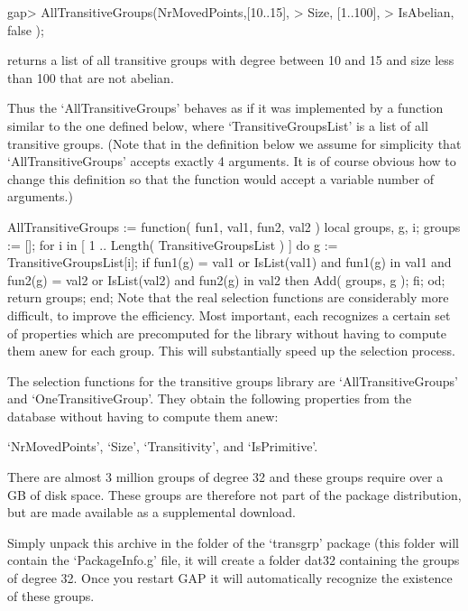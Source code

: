 \beginexample
gap> AllTransitiveGroups(NrMovedPoints,[10..15],
>                        Size,         [1..100],
>                        IsAbelian,    false    );
\endexample

returns a list of all transitive groups with degree between 10 and 15 and
size less than 100 that are not abelian.

Thus  the `AllTransitiveGroups'  behaves  as if   it was implemented  by a
function similar to the one defined below, where `TransitiveGroupsList' is a
list of all transitive groups.  (Note that in  the definition below we assume
for simplicity that `AllTransitiveGroups' accepts exactly 4 arguments.  It is
of course  obvious how to change this  definition so that the function would
accept a variable number of arguments.)

\begintt
AllTransitiveGroups := function( fun1, val1, fun2, val2 )
local    groups, g, i;
  groups := [];
  for i  in [ 1 .. Length( TransitiveGroupsList ) ] do
    g := TransitiveGroupsList[i];
    if      fun1(g) = val1  or IsList(val1) and fun1(g) in val1
        and fun2(g) = val2  or IsList(val2) and fun2(g) in val2
     then
      Add( groups, g );
    fi;
  od;
  return groups;
end;
\endtt
Note that the real  selection functions are considerably  more difficult,
to improve the efficiency. Most  important, each recognizes a certain set
of properties which are precomputed for the library without having to
compute them anew for each group. This will substantially speed up the
selection process.

The selection functions for the transitive
groups library are `AllTransitiveGroups' and `OneTransitiveGroup'. They
obtain the following properties from the database without having to compute
them anew:

`NrMovedPoints', `Size',   `Transitivity', and `IsPrimitive'.


There are almost 3 million groups of degree 32 and these groups require over
a GB of disk space. These groups are therefore not part of the package
distribution, but are made available as a supplemental download.



Simply unpack this archive in the folder of the `transgrp' package (this
folder will contain the `PackageInfo.g' file, it will create a folder dat32
containing the groups of degree 32. Once you restart GAP it will
automatically recognize the existence of these groups.
